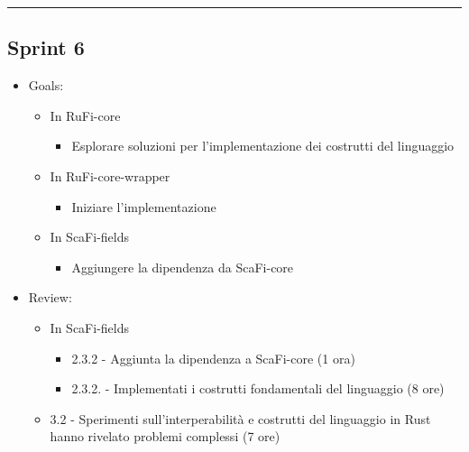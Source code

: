 \documentclass[12pt, a4paper]{article}
\begin{document}
\par\noindent\rule{\textwidth}{0.5pt}


\subsection*{Sprint 6}

\begin{itemize}
    \item Goals:
          \begin{itemize}
              \color{teal}
              \item In RuFi-core
                    \begin{itemize}
                        \item Esplorare soluzioni per l'implementazione dei costrutti del linguaggio
                    \end{itemize}
                    \color{magenta}
              \item In RuFi-core-wrapper
                    \begin{itemize}
                        \item Iniziare l'implementazione
                    \end{itemize}
                    \color{blue}

              \item In ScaFi-fields
                    \begin{itemize}
                        \item Aggiungere la dipendenza da ScaFi-core
                    \end{itemize}
          \end{itemize}
    \item Review:
          \begin{itemize}
              \color{blue}

              \item In ScaFi-fields
                    \begin{itemize}
                        \item 2.3.2 - Aggiunta la dipendenza a ScaFi-core (1 ora)
                        \item 2.3.2. - Implementati i costrutti fondamentali del linguaggio (8 ore)
                    \end{itemize}
              \item 3.2 - Sperimenti sull'interperabilità e costrutti del linguaggio in Rust hanno rivelato problemi complessi (7 ore)
          \end{itemize}
\end{itemize}
\end{document}
